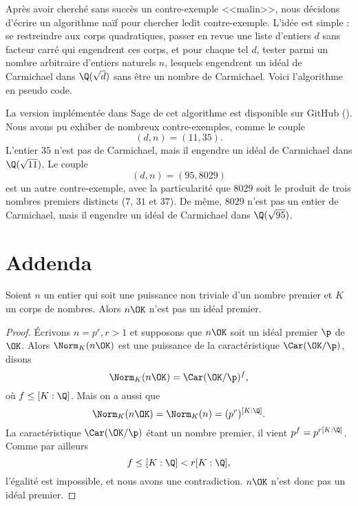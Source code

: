 \documentclass[a4paper, 12pt, oneside]{article}
\begin{document}
Après avoir cherché sans succès un contre-exemple <<malin>>, nous décidons d'écrire un algorithme naïf pour chercher ledit contre-exemple. L'idée est simple : se restreindre aux corps quadratiques, passer en revue une liste d'entiers $d$ sans facteur carré qui engendrent ces corps, et pour chaque tel $d$, tester parmi un nombre arbitraire d'entiers naturels $n$, lesquels engendrent un idéal de Carmichael dans $\Q(\sqrt{d})$ sans être un nombre de Carmichael. Voici l'algorithme en pseudo code. \\

\begin{algorithm}[H]
\end{algorithm}

\vspace{1em}
La version implémentée dans Sage de cet algorithme est disponible sur GitHub (). Nous avons pu exhiber de nombreux contre-exemples, comme le couple $$(d, n) = (11, 35).$$ L'entier $35$ n'est pas de Carmichael, mais il engendre un idéal de Carmichael dans $\Q(\sqrt{11})$. Le couple $$(d, n) = (95,8029)$$ est un autre contre-exemple, avec la particularité que $8029$ soit le produit de trois nombres premiers distincts ($7$, $31$ et $37$). De même, $8029$ n'est pas un entier de Carmichael, mais il engendre un idéal de Carmichael dans $\Q(\sqrt{95})$.

\section{Addenda}

\begin{fait}
Soient $n$ un entier qui soit une puissance non triviale d'un nombre premier et $ K$ un corps de nombres. Alors $n\OK$ n'est pas un idéal premier.
\end{fait}

\begin{proof}
Écrivons $n = p^r, r>1$ et supposons que $n\OK$ soit un idéal premier $\p$ de $\OK$. Alors $\Norm_K(n\OK)$ est une puissance de la caractéristique $\Car(\OK/\p)$, disons $$\Norm_K(n\OK) = \Car(\OK/\p)^f,$$ où $f \leq [K : \Q]$. Mais on a aussi que $$\Norm_K(n\OK) = \Norm_K(n) = (p^r)^{[K : \Q]}.$$ La caractéristique $\Car(\OK/\p)$ étant un nombre premier, il vient $p^f = p^{r[K : \Q]}$. Comme par ailleurs $$f \leq [K : \Q] < r[K : \Q],$$ l'égalité est impossible, et nous avons une contradiction. $n\OK$ n'est donc pas un idéal premier.
\end{proof}
\end{document}
